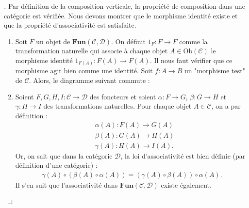 \documentclass{article}
\begin{document}
\begin{proof}[]{}
    Par définition de la composition verticale, la propriété de composition dans une catégorie est vérifiée. Nous devons montrer que le morphisme identité existe et que la propriété d'associativité est satisfaite.
    \begin{enumerate}
        \item Soit $F$ un objet de $\textbf{Fun}(\mathcal C, \mathcal D)$. On définit $1_F:F\to F$ comme la transformation naturelle qui associe à chaque objet $A\in\text{Ob}(\mathcal C)$ le morphisme identité $1_{F(A)}:F(A)\to F(A)$. Il nous faut vérifier que ce morphisme agit bien comme une identité. Soit  $f:A\to B$ un "morphisme test" de $\mathcal C$. Alors, le diagramme suivant commute :
        \begin{center}
        \end{center}
        \item Soient $F, G, H, I:\mathcal C\to\mathcal D$ des foncteurs et soient $\alpha:F\to G$, $\beta:G\to H$ et $\gamma:H\to I$ des transformations naturelles. Pour chaque objet $A\in\mathcal C$, on a par définition :
        \begin{equation*}
        \begin{aligned}
            & \alpha(A):F(A)\to G(A)\\
            & \beta(A):G(A)\to H(A)\\
            & \gamma(A):H(A)\to I(A).
        \end{aligned}
        \end{equation*}
        Or, on sait que dans la catégorie $\mathcal D$, la loi d'associativité est bien définie (par définition d'une catégorie) :
        \begin{equation*}
        \begin{aligned}
            \gamma(A)\circ(\beta(A)\circ\alpha(A))=(\gamma(A)\circ\beta(A))\circ\alpha(A).
        \end{aligned}
        \end{equation*}
        Il s'en suit que l'associativité dans $\textbf{Fun}(\mathcal C, \mathcal D)$ existe également.
    \end{enumerate}
\end{proof}
\end{document}
